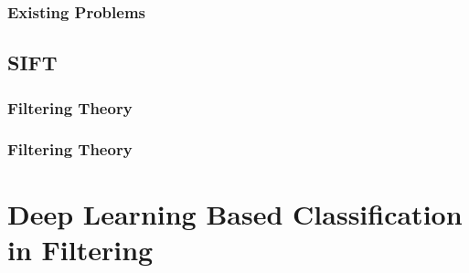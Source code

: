 \subsubsection{Existing Problems}

\subsection{SIFT}

\subsubsection{Filtering Theory}

\subsubsection{Filtering Theory}

\section{Deep Learning Based Classification in Filtering}




